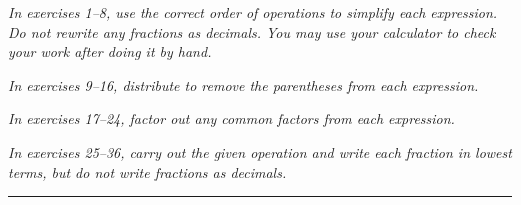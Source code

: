\begin{exercises}
\textit{In exercises 1--8, use the correct order of operations to simplify each expression.  Do not rewrite any fractions as decimals.  You may use your calculator to check your work after doing it by hand.}



\textit{In exercises 9--16, distribute to remove the parentheses from each expression.}



\textit{In exercises 17--24, factor out any common factors from each expression.}



\textit{In exercises 25--36, carry out the given operation and write each fraction in lowest terms, but do not write fractions as decimals.}




\vspace*{0.25in}

{\color{blue!60!black} \rule{\textwidth}{3pt}}
\vspace*{0.25in}
\vfill
\pagebreak


\end{exercises}
